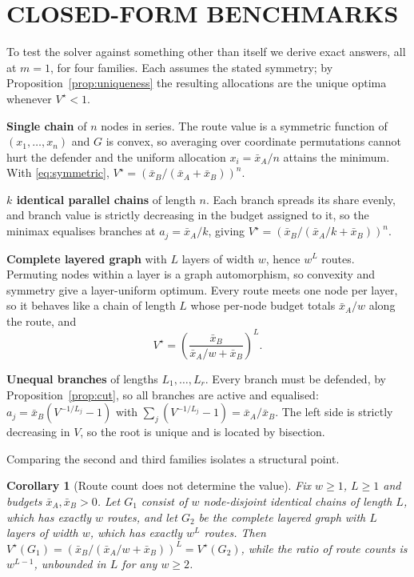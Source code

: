\documentclass[10pt,a4paper,twoside]{article}
\theoremstyle{plain}
\newtheorem{corollary}[theorem]{Corollary}
\theoremstyle{definition}
\newcommand{\XA}{\bar{x}_A}
\newcommand{\XB}{\bar{x}_B}
\begin{document}
\section{CLOSED-FORM BENCHMARKS}
\label{sec:closed-form}

To test the solver against something other than itself we derive exact
answers, all at $m=1$, for four families. Each assumes the stated symmetry;
by Proposition~\ref{prop:uniqueness} the resulting allocations are the unique
optima whenever $V^{\star}<1$.

\textbf{Single chain} of $n$ nodes in series. The route value is a symmetric
function of $(x_1,\dots,x_n)$ and $G$ is convex, so averaging over
coordinate permutations cannot hurt the defender and the uniform allocation
$x_i=\XA/n$ attains the minimum. With \eqref{eq:symmetric},
$V^{\star}=(\XB/(\XA+\XB))^n$.

\textbf{$k$ identical parallel chains} of length $n$. Each branch spreads its
share evenly, and branch value is strictly decreasing in the budget assigned
to it, so the minimax equalises branches at $a_j=\XA/k$, giving
$V^{\star}=(\XB/(\XA/k+\XB))^n$.

\textbf{Complete layered graph} with $L$ layers of width $w$, hence $w^L$
routes. Permuting nodes within a layer is a graph automorphism, so convexity
and symmetry give a layer-uniform optimum. Every route meets one node per
layer, so it behaves like a chain of length $L$ whose per-node budget totals
$\XA/w$ along the route, and
\begin{equation}
  V^{\star}=\left(\frac{\XB}{\XA/w+\XB}\right)^{\!L}.
  \label{eq:cf-layered}
\end{equation}

\textbf{Unequal branches} of lengths $L_1,\dots,L_r$. Every branch must be
defended, by Proposition~\ref{prop:cut}, so all branches are active and
equalised: $a_j=\XB(V^{-1/L_j}-1)$ with $\sum_j(V^{-1/L_j}-1)=\XA/\XB$. The
left side is strictly decreasing in $V$, so the root is unique and is located
by bisection.

Comparing the second and third families isolates a structural point.

\begin{corollary}[Route count does not determine the value]
\label{cor:path-count}
Fix $w\ge1$, $L\ge1$ and budgets $\XA,\XB>0$. Let $G_1$ consist of $w$
node-disjoint identical chains of length $L$, which has exactly $w$ routes,
and let $G_2$ be the complete layered graph with $L$ layers of width $w$,
which has exactly $w^L$ routes. Then
$V^{\star}(G_1)=(\XB/(\XA/w+\XB))^L=V^{\star}(G_2)$, while the ratio of route
counts is $w^{L-1}$, unbounded in $L$ for any $w\ge2$.
\end{corollary}
\end{document}
